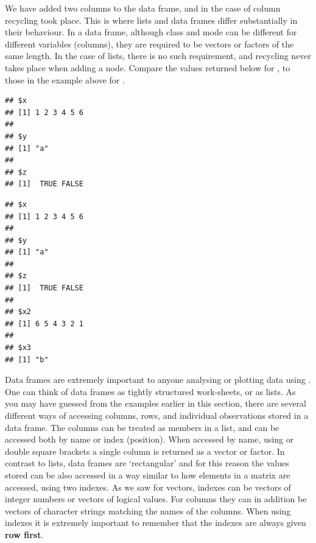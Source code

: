 \documentclass[krantz2]{krantz}\usepackage{knitr}%
\begin{document}
We have added two columns to the data frame, and in the case of column  recycling took place. This is where lists and data frames differ substantially in their behaviour. In a data frame, although class and mode can be different for different variables (columns), they are required to be vectors or factors of the same length. In the case of lists, there is no such requirement, and recycling never takes place when adding a node. Compare the values returned below for , to those in the example above for .

\begin{knitrout}\footnotesize
{}\color{fgcolor}\begin{kframe}
\begin{alltt}
 \hlkwb{<-} \hlstd{(} \hlstd{=} \hlopt{:}\hlstd{,}  \hlstd{=} \hlstd{,}  \hlstd{=} \hlstd{(}\hlstd{,} \hlstd{))}
\end{alltt}
\begin{verbatim}
## $x
## [1] 1 2 3 4 5 6
## 
## $y
## [1] "a"
## 
## $z
## [1]  TRUE FALSE
\end{verbatim}
\begin{alltt}
\hlopt{$} \hlkwb{<-} \hlopt{:}
\hlopt{$} \hlkwb{<-} 
\end{alltt}
\begin{verbatim}
## $x
## [1] 1 2 3 4 5 6
## 
## $y
## [1] "a"
## 
## $z
## [1]  TRUE FALSE
## 
## $x2
## [1] 6 5 4 3 2 1
## 
## $x3
## [1] "b"
\end{verbatim}
\end{kframe}
\end{knitrout}

Data frames are extremely important to anyone analysing or plotting data using \Rlang. One can think of data frames as tightly structured work-sheets, or as lists. As you may have guessed from the examples earlier in this section, there are several different ways of accessing columns, rows, and individual observations stored in a data frame. The columns can be treated as members in a list, and can be accessed both by name or index (position). When accessed by name, using \Roperator{\$} or double square brackets a single column is returned as a vector or factor. In contrast to lists, data frames are `rectangular' and for this reason the values stored can be also accessed in a way similar to how elements in a matrix are accessed, using two indexes. As we saw for vectors, indexes can be vectors of integer numbers or vectors of logical values. For columns they can in addition be vectors of character strings matching the names of the columns. When using indexes it is extremely important to remember that the indexes are always given \textbf{row first}.
\end{document}
